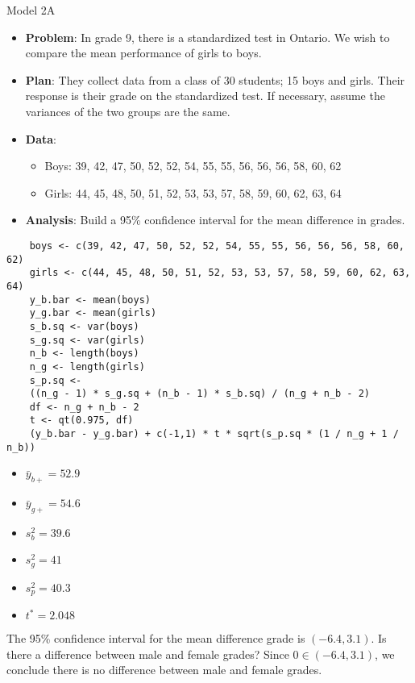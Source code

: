 \begin{Example}{Model 2A}{}
    \begin{itemize}
        \item \textbf{Problem}: In grade 9, there is a standardized test in Ontario.
              We wish to compare the mean performance of girls to boys.
        \item \textbf{Plan}: They collect data from a class of 30 students;
              15 boys and girls. Their response is their grade on the standardized test.
              If necessary, assume the variances of the two groups are the same.
        \item \textbf{Data}:
              \begin{itemize}
                  \item Boys: 39, 42, 47, 50, 52, 52, 54, 55, 55, 56, 56, 56, 58, 60, 62
                  \item Girls: 44, 45, 48, 50, 51, 52, 53, 53, 57, 58, 59, 60, 62, 63, 64
              \end{itemize}
        \item \textbf{Analysis}: Build a 95\% confidence interval for the mean difference
              in grades.
    \end{itemize}
    \begin{verbatim}
    boys <- c(39, 42, 47, 50, 52, 52, 54, 55, 55, 56, 56, 56, 58, 60, 62)
    girls <- c(44, 45, 48, 50, 51, 52, 53, 53, 57, 58, 59, 60, 62, 63, 64)
    y_b.bar <- mean(boys)
    y_g.bar <- mean(girls)
    s_b.sq <- var(boys)
    s_g.sq <- var(girls)
    n_b <- length(boys)
    n_g <- length(girls)
    s_p.sq <-
    ((n_g - 1) * s_g.sq + (n_b - 1) * s_b.sq) / (n_g + n_b - 2)
    df <- n_g + n_b - 2
    t <- qt(0.975, df)
    (y_b.bar - y_g.bar) + c(-1,1) * t * sqrt(s_p.sq * (1 / n_g + 1 / n_b))
    \end{verbatim}
    \begin{itemize}
        \item $ \bar{y}_{b+}=52.9 $
        \item $ \bar{y}_{g+}=54.6 $
        \item $ s_b^2=39.6 $
        \item $ s_g^2=41 $
        \item $ s_p^2=40.3 $
        \item $ t^*=2.048 $
    \end{itemize}
    The 95\% confidence interval for the mean difference grade is
    $ (-6.4,3.1) $. Is there a difference between male and female grades?
    Since $ 0\in(-6.4,3.1) $, we conclude there is no difference between male
    and female grades.
\end{Example}
